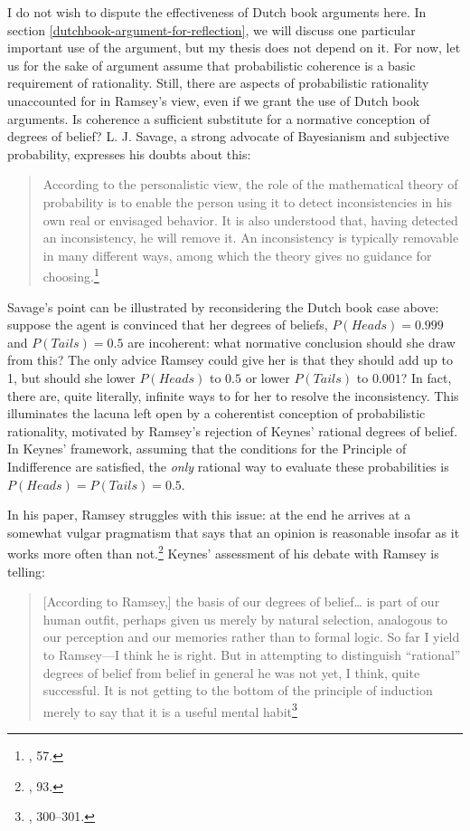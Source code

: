 I do not wish to dispute the effectiveness of Dutch book arguments here. In section \ref{dutchbook-argument-for-reflection}, we will discuss one particular important use of the argument, but my thesis does not depend on it.
For now, let us for the sake of argument assume that probabilistic coherence is a
basic requirement of rationality. Still, there are aspects of probabilistic rationality  unaccounted for in Ramsey's view, even
if we grant the use of Dutch book arguments. Is coherence a
sufficient substitute for a normative conception of degrees of belief?
L. J. Savage, a strong advocate of Bayesianism and subjective
probability, expresses his doubts about this:

\begin{quote}
According to the personalistic view, the role of the mathematical theory
of probability is to enable the person using it to detect
inconsistencies in his own real or envisaged behavior. It is also
understood that, having detected an inconsistency, he will remove it. An
inconsistency is typically removable in many different ways, among which
the theory gives no guidance for choosing.\footnote{\cite{savage}, 57.}
\end{quote}

Savage's point can be illustrated by reconsidering the Dutch book case
above: suppose the agent is convinced that her degrees of beliefs,
\(P(Heads) = 0.999\) and \(P(Tails) = 0.5\) are incoherent: what
normative conclusion should she draw from this? The only advice Ramsey
could give her is that they should add up to 1, but should she lower
\(P(Heads)\) to \(0.5\) or lower \(P(Tails)\) to \(0.001\)? In fact,
there are, quite literally, infinite ways to for her to resolve the
inconsistency. This illuminates the lacuna left open by a coherentist conception of probabilistic rationality, motivated by Ramsey's rejection of Keynes' rational degrees
of belief. In Keynes' framework, assuming that the conditions for the
Principle of Indifference are satisfied, the \emph{only} rational way to
evaluate these probabilities is \(P(Heads) = P(Tails) = 0.5\).

In his paper, Ramsey struggles with this issue: at the end he arrives at
a somewhat vulgar pragmatism that says that an opinion is reasonable
insofar as it works more often than not.\footnote{\cite{ramsey}, 93.} 
Keynes' assessment of his debate
with Ramsey is telling:

\begin{quote}
{[}According to Ramsey,{]} the basis of our degrees of belief\ldots{} is
part of our human outfit, perhaps given us merely by natural selection,
analogous to our perception and our memories rather than to formal
logic. So far I yield to Ramsey---I think he is right. But in attempting
to distinguish ``rational'' degrees of belief from belief in general he
was not yet, I think, quite successful. It is not getting to the bottom
of the principle of induction merely to say that it is a useful mental
habit\footnote{\cite{keynesbio}, 300--301.}
\end{quote}

